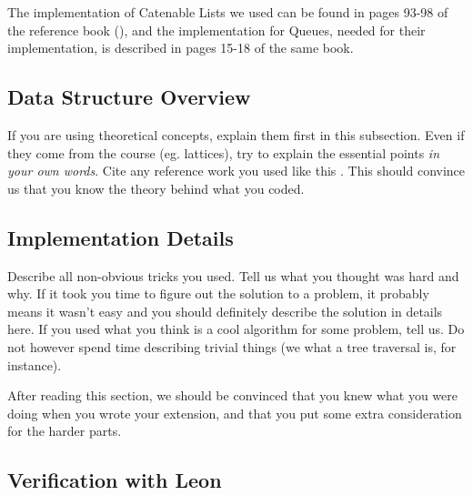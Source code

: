 The implementation of Catenable Lists we used can be found 
in pages 93-98 of the reference book (\cite{Okasaki}),
and the implementation for Queues, needed for their implementation, 
is described in pages 15-18 of the same book.

\subsection{Data Structure Overview}
If you are using theoretical concepts, explain them first in this subsection.
Even if they come from the course (eg. lattices), try to explain the essential
points \emph{in your own words}. Cite any reference work you used like this
\cite{TigerBook}. This should convince us that you know the theory behind what
you coded. 

\subsection{Implementation Details}
Describe all non-obvious tricks you used. Tell us what you thought was hard and
why. If it took you time to figure out the solution to a problem, it probably
means it wasn't easy and you should definitely describe the solution in details
here. If you used what you think is a cool algorithm for some problem, tell us.
Do not however spend time describing trivial things (we what a tree traversal
is, for instance). 

After reading this section, we should be convinced that you knew what you were
doing when you wrote your extension, and that you put some extra consideration
for the harder parts.

\subsection{Verification with Leon}
